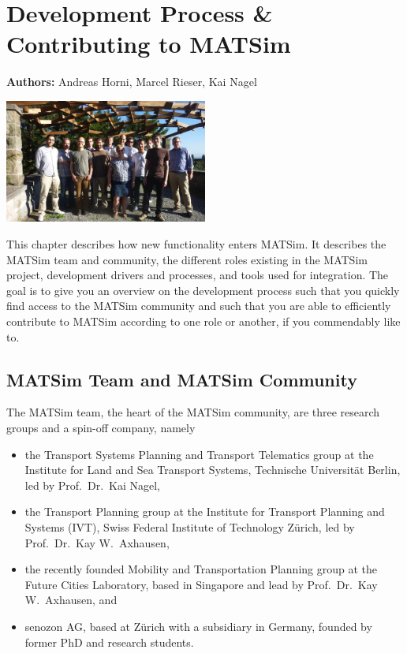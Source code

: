 \chapter{Development Process \& Contributing to MATSim}
\label{ch:developmentprocess}

\hfill \textbf{Authors:} Andreas Horni, Marcel Rieser, Kai Nagel

\begin{center} \includegraphics[width=0.5\textwidth, angle=0]{extending/figures/ConceptualMeetingVillaHatt.png} \end{center}

This chapter describes how new functionality enters MATSim. It describes the MATSim team and community, the different roles existing in the MATSim project, development drivers and processes, and tools used for integration. The goal is to give you an overview on the development process such that you quickly find access to the MATSim community and such that you are able to efficiently contribute to MATSim according to one role or another, if you commendably like to.

\section{MATSim Team and MATSim Community}
The MATSim team, the heart of the MATSim community, are three research groups and a spin-off company, namely 
\begin{itemize}
\item the Transport Systems Planning and Transport Telematics group at the Institute for Land and Sea Transport Systems, Technische Universität Berlin, led by Prof.\ Dr.\ Kai Nagel,
\item the Transport Planning group at the Institute for Transport Planning and Systems (IVT), Swiss Federal Institute of Technology Zürich, led by Prof.\ Dr.\ Kay W.\ Axhausen, 
\item the recently founded Mobility and Transportation Planning group at the Future Cities Laboratory, based in Singapore and lead by Prof.\ Dr.\ Kay W.\ Axhausen, and 
\item senozon AG, based at Zürich with a subsidiary in Germany, founded by former PhD and research students. 
\end{itemize}

